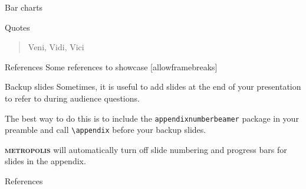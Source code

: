 \documentclass[10pt]{beamer}
\newcommand{\themename}{\textbf{\textsc{metropolis}}\xspace}
\begin{document}
\begin{frame}{Bar charts}
  \begin{figure}
  \end{figure}
\end{frame}

\begin{frame}{Quotes}
  \begin{quote}
    Veni, Vidi, Vici
  \end{quote}
\end{frame}

\begin{frame}{References}
  Some references to showcase [allowframebreaks] \cite{knuth92,ConcreteMath,Simpson,Er01,greenwade93}
\end{frame}

\appendix

\begin{frame}[fragile]{Backup slides}
  Sometimes, it is useful to add slides at the end of your presentation to
  refer to during audience questions.

  The best way to do this is to include the \verb|appendixnumberbeamer|
  package in your preamble and call \verb|\appendix| before your backup slides.

  \themename will automatically turn off slide numbering and progress bars for
  slides in the appendix.
\end{frame}

\begin{frame}[allowframebreaks]{References}

  
  

\end{frame}
\end{document}
